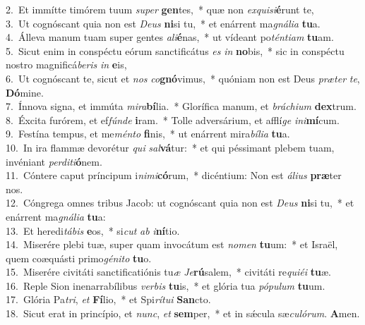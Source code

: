{2.~}Et immítte timórem tuum \textit{su}\textit{per} \textbf{gen}tes,~* quæ non \textit{ex}\textit{qui}\textit{si}\textbf{é}runt te,\\
{3.~}Ut cognóscant quia non est \textit{De}\textit{us} \textbf{ni}si tu,~* et enárrent ma\textit{gná}\textit{li}\textit{a} \textbf{tu}a.\\
{4.~}Álleva manum tuam super gentes \textit{a}\textit{li}\textbf{é}nas,~* ut vídeant po\textit{tén}\textit{ti}\textit{am} \textbf{tu}am.\\
{5.~}Sicut enim in conspéctu eórum sanctificátus \textit{es} \textit{in} \textbf{no}bis,~* sic in conspéctu nostro magnificá\textit{be}\textit{ris} \textit{in} \textbf{e}is,\\
{6.~}Ut cognóscant te, sicut et \textit{nos} \textit{co}\textbf{gnó}vimus,~* quóniam non est Deus \textit{præ}\textit{ter} \textit{te}, \textbf{Dó}mine.\\
{7.~}Ínnova signa, et immúta \textit{mi}\textit{ra}\textbf{bí}lia.~* Glorífica manum, et \textit{brá}\textit{chi}\textit{um} \textbf{dex}trum.\\
{8.~}Éxcita furórem, et ef\textit{fún}\textit{de} \textbf{i}ram.~* Tolle adversárium, et afflí\textit{ge} \textit{i}\textit{ni}\textbf{mí}cum.\\
{9.~}Festína tempus, et me\textit{mén}\textit{to} \textbf{fi}nis,~* ut enárrent mira\textit{bí}\textit{li}\textit{a} \textbf{tu}a.\\
{10.~}In ira flammæ devorétur \textit{qui} \textit{sal}\textbf{vá}tur:~* et qui péssimant plebem tuam, invéniant \textit{per}\textit{di}\textit{ti}\textbf{ó}nem.\\
{11.~}Cóntere caput príncipum i\textit{ni}\textit{mi}\textbf{có}rum,~* dicéntium: Non est \textit{á}\textit{li}\textit{us} \textbf{præ}ter nos.\\
{12.~}Cóngrega omnes tribus Jacob: ut cognóscant quia non est \textit{De}\textit{us} \textbf{ni}si tu,~* et enárrent ma\textit{gná}\textit{li}\textit{a} \textbf{tu}a:\\
{13.~}Et heredi\textit{tá}\textit{bis} \textbf{e}os,~* si\textit{cut} \textit{ab} \textit{i}\textbf{ní}tio.\\
{14.~}Miserére plebi tuæ, super quam invocátum est \textit{no}\textit{men} \textbf{tu}um:~* et Israël, quem coæquásti primo\textit{gé}\textit{ni}\textit{to} \textbf{tu}o.\\
{15.~}Miserére civitáti sanctificatiónis tu\textit{æ} \textit{Je}\textbf{rú}salem,~* civitáti re\textit{qui}\textit{é}\textit{i} \textbf{tu}æ.\\
{16.~}Reple Sion inenarrabílibus \textit{ver}\textit{bis} \textbf{tu}is,~* et glória tua \textit{pó}\textit{pu}\textit{lum} \textbf{tu}um.\\
{17.~}Glória Pa\textit{tri}, \textit{et} \textbf{Fí}lio,~* et Spi\textit{rí}\textit{tu}\textit{i} \textbf{San}cto.\\
{18.~}Sicut erat in princípio, et \textit{nunc}, \textit{et} \textbf{sem}per,~* et in sǽcula sæ\textit{cu}\textit{ló}\textit{rum}. \textbf{A}men.\\
